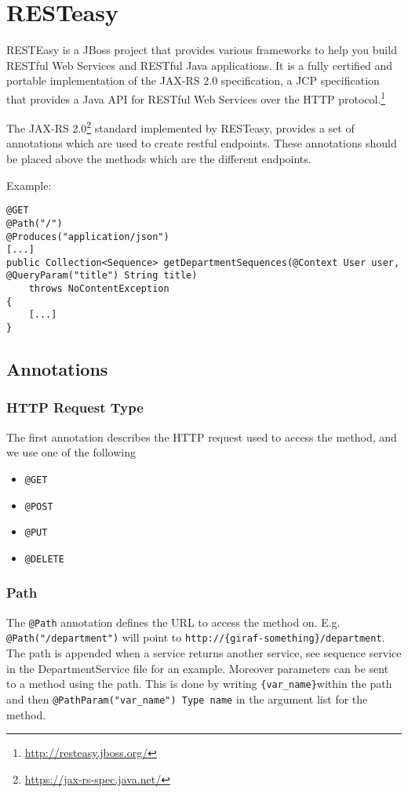 \newpage
\section{RESTeasy}\label{app:resteasy}
\begin{displayquote}
RESTEasy is a JBoss project that provides various frameworks to help you build RESTful Web Services and RESTful Java applications.
It is a fully certified and portable implementation of the JAX-RS 2.0 specification, a JCP specification that provides a Java API for RESTful Web Services over the HTTP protocol.\footnote{\url{http://resteasy.jboss.org/}}
\end{displayquote}

\noindent
The JAX-RS 2.0\footnote{\url{https://jax-rs-spec.java.net/}} standard implemented by RESTeasy, provides a set of annotations which are used to create restful endpoints. These annotations should be placed above the methods which are the different endpoints.

\bigskip\noindent
Example:
\begin{lstlisting}
@GET
@Path("/")
@Produces("application/json")
[...]
public Collection<Sequence> getDepartmentSequences(@Context User user, @QueryParam("title") String title)
    throws NoContentException
{
    [...]
}
\end{lstlisting}

\subsection{Annotations}

\subsubsection{HTTP Request Type}
The first annotation describes the HTTP request used to access the method, and we use one of the following
\begin{itemize}
    \item \texttt{@GET}
    \item \texttt{@POST}
    \item \texttt{@PUT}
    \item \texttt{@DELETE}
\end{itemize}

\subsubsection{Path}
The \texttt{@Path} annotation defines the URL to access the method on. E.g. \texttt{@Path("/department")} will point to \texttt{http://\{giraf-something\}/department}.
The path is appended when a service returns another service, see sequence service in the DepartmentService file for an example.
Moreover parameters can be sent to a method using the path. This is done by writing \texttt{\{var\_name\}}within the path and then \texttt{@PathParam("var\_name") Type name} in the argument list for the method.


